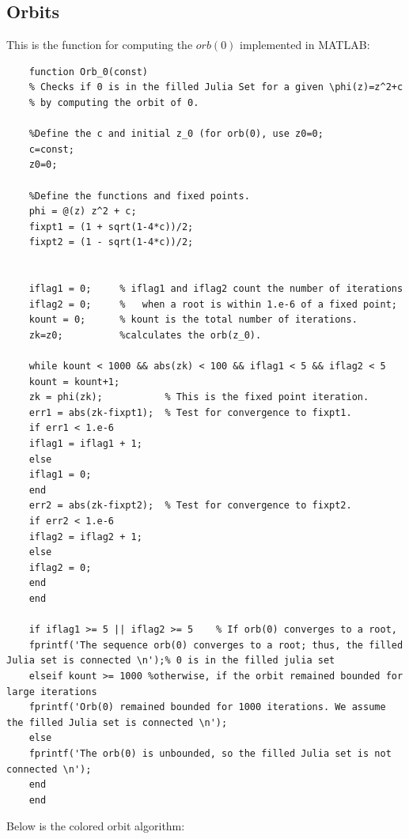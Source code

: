 \documentclass[12pt]{article}
\begin{document}
	\subsection{Orbits}\label{orbit}
	This is the function for computing the $orb(0)$ implemented in MATLAB:
	\begin{verbatim}
	function Orb_0(const)
	% Checks if 0 is in the filled Julia Set for a given \phi(z)=z^2+c
	% by computing the orbit of 0.
	
	%Define the c and initial z_0 (for orb(0), use z0=0;
	c=const;
	z0=0;
	
	%Define the functions and fixed points.
	phi = @(z) z^2 + c;
	fixpt1 = (1 + sqrt(1-4*c))/2;
	fixpt2 = (1 - sqrt(1-4*c))/2;
	
	
	iflag1 = 0;     % iflag1 and iflag2 count the number of iterations
	iflag2 = 0;     %   when a root is within 1.e-6 of a fixed point;
	kount = 0;      % kount is the total number of iterations.
	zk=z0;          %calculates the orb(z_0).
	
	while kount < 1000 && abs(zk) < 100 && iflag1 < 5 && iflag2 < 5
	kount = kount+1;
	zk = phi(zk);           % This is the fixed point iteration.
	err1 = abs(zk-fixpt1);  % Test for convergence to fixpt1.
	if err1 < 1.e-6
	iflag1 = iflag1 + 1;
	else
	iflag1 = 0;
	end
	err2 = abs(zk-fixpt2);  % Test for convergence to fixpt2.
	if err2 < 1.e-6
	iflag2 = iflag2 + 1;
	else
	iflag2 = 0;
	end
	end
	
	if iflag1 >= 5 || iflag2 >= 5    % If orb(0) converges to a root, 
	fprintf('The sequence orb(0) converges to a root; thus, the filled Julia set is connected \n');% 0 is in the filled julia set
	elseif kount >= 1000 %otherwise, if the orbit remained bounded for large iterations
	fprintf('Orb(0) remained bounded for 1000 iterations. We assume the filled Julia set is connected \n'); 
	else
	fprintf('The orb(0) is unbounded, so the filled Julia set is not connected \n');
	end
	end
	\end{verbatim}
	
	
	
\noindent	Below is the colored orbit algorithm:\\
\end{document}
